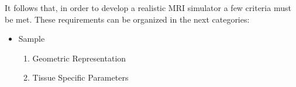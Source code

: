 It follows that, in order to develop a realistic MRI simulator a few criteria must be met. These requirements can be organized in the next categories:


\begin{itemize}
\item{Sample}

\begin{enumerate}
    \item Geometric Representation
        
        
        
    
    \item Tissue Specific Parameters
    

\end{enumerate}
\end{itemize}
